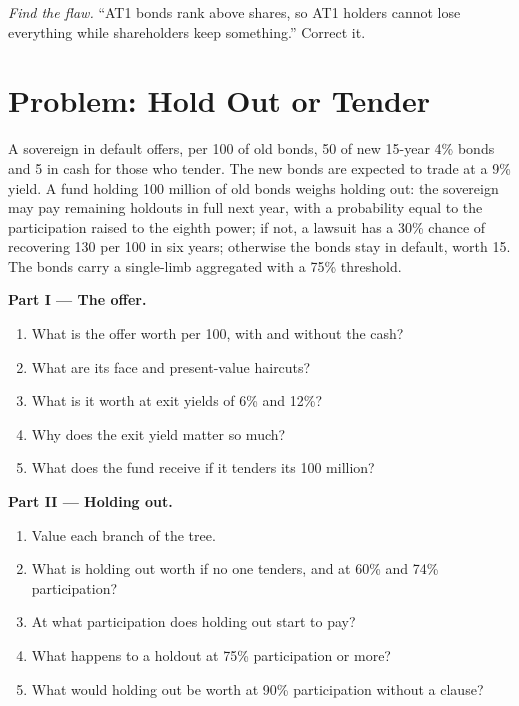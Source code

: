 \begin{exercise}[$\star\star\star$]\label{exo:m2:distressed-sovereign-and-bank-capital-credit:8}
\emph{Find the flaw.} ``AT1 bonds rank above shares, so AT1 holders cannot lose
everything while shareholders keep something.'' Correct it.
\end{exercise}

\section{Problem: Hold Out or Tender}

\begin{problem}\label{pb:m2:distressed-sovereign-and-bank-capital-credit:1}
A sovereign in default offers, per 100 of old bonds, 50 of new 15-year 4\% bonds and 5
in cash for those who tender. The new bonds are expected to trade at a 9\% yield. A fund
holding 100 million of old bonds weighs holding out: the sovereign may pay remaining
holdouts in full next year, with a probability equal to the participation raised to the
eighth power; if not, a lawsuit has a 30\% chance of recovering 130 per 100 in six
years; otherwise the bonds stay in default, worth 15. The bonds carry a single-limb
aggregated  with a 75\% threshold.

\medskip\noindent\textbf{Part I --- The offer.}
\begin{enumerate}
\item What is the offer worth per 100, with and without the cash?
\item What are its face and present-value haircuts?
\item What is it worth at exit yields of 6\% and 12\%?
\item Why does the exit yield matter so much?
\item What does the fund receive if it tenders its 100 million?
\end{enumerate}

\medskip\noindent\textbf{Part II --- Holding out.}
\begin{enumerate}[resume]
\item Value each branch of the tree.
\item What is holding out worth if no one tenders, and at 60\% and 74\% participation?
\item At what participation does holding out start to pay?
\item What happens to a holdout at 75\% participation or more?
\item What would holding out be worth at 90\% participation without a clause?
\end{enumerate}


\end{problem}
